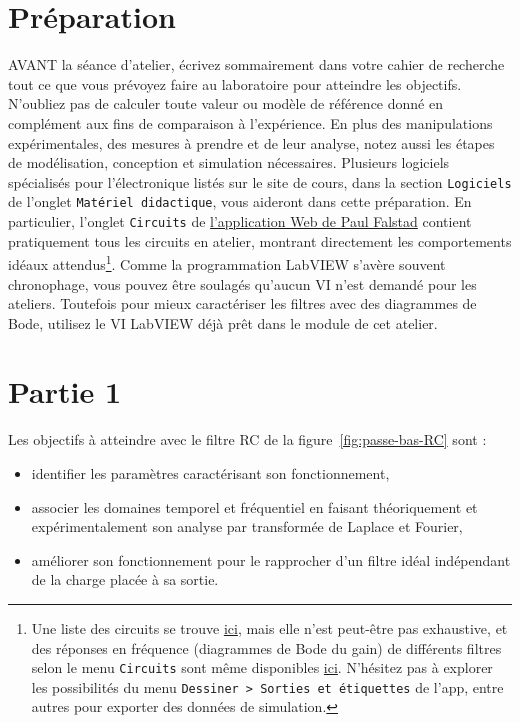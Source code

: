 \documentclass[canadien,12pt,oneside,letterpaper]{article}
\begin{document}
\section{Préparation}\label{sec:prep}
\vspace{-3ex}
AVANT la séance d'atelier, écrivez sommairement dans votre cahier de recherche tout ce que vous prévoyez faire au laboratoire pour atteindre les objectifs. N'oubliez pas de calculer toute valeur ou modèle de référence donné en complément aux fins de comparaison à l'expérience. En plus des manipulations expérimentales, des mesures à prendre et de leur analyse, notez aussi les étapes de modélisation, conception et simulation nécessaires. Plusieurs logiciels spécialisés pour l'électronique listés sur le site de cours, dans la section \texttt{Logiciels} de l'onglet \texttt{Matériel didactique}, vous aideront dans cette préparation. En particulier, l'onglet \texttt{Circuits} de \href{https://www.falstad.com/circuit/}{l'application Web de Paul Falstad} contient pratiquement tous les circuits en atelier, montrant directement les comportements idéaux attendus\footnote{Une liste des circuits se trouve \href{https://www.falstad.com/circuit/directions.html}{ici}, mais elle n'est peut-être pas exhaustive, et des réponses en fréquence (diagrammes de Bode du gain) de différents filtres selon le menu \texttt{Circuits} sont même disponibles \href{https://www.falstad.com/afilter/}{ici}. N'hésitez pas à explorer les possibilités du menu \texttt{Dessiner~>~Sorties et étiquettes} de l'app, entre autres pour exporter des données de simulation.}. Comme la programmation LabVIEW s'avère souvent chronophage, vous pouvez être soulagés qu'aucun VI n'est demandé pour les ateliers. Toutefois pour mieux caractériser les filtres avec des diagrammes de Bode, utilisez le VI LabVIEW déjà prêt dans le module de cet atelier.

\section{Partie 1}\label{sec:analyseRC}
Les objectifs à atteindre avec le filtre RC de la figure~\ref{fig:passe-bas-RC} sont :

\begin{itemize}
    \item identifier les paramètres caractérisant son fonctionnement,
    \item associer les domaines temporel et fréquentiel en faisant théoriquement et expérimentalement son analyse par transformée de Laplace et Fourier,
    \item améliorer son fonctionnement pour le rapprocher d'un filtre idéal indépendant de la charge placée à sa sortie.
\end{itemize}
\end{document}
